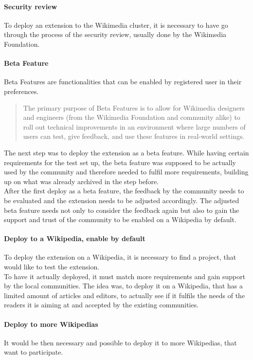   \paragraph{Security review}
  To deploy an extension to the Wikimedia cluster, it is necessary to have go through the process of the security review, usually done by the Wikimedia Foundation.

  \paragraph{Beta Feature}
  Beta Features are functionalities that can be enabled by registered user in their preferences. 
  \begin{quotation}
	  The primary purpose of Beta Features is to allow for Wikimedia designers and engineers (from the Wikimedia Foundation and community alike) to roll out technical improvements in an environment where large numbers of users can test, give feedback, and use these features in real-world settings.
  \end{quotation}   
  
  The next step was to deploy the extension as a beta feature. While having certain requirements for the test set up, the beta feature was supposed to be actually used by the community and therefore needed to fulfil more requirements, building up on what was already archived in the step before. \\
  After the first deploy as a beta feature, the feedback by the community needs to be evaluated and the extension needs to be adjusted accordingly. The adjusted beta feature needs not only to consider the feedback again but also to gain the support and trust of the community to be enabled on a Wikipedia by default.

  \paragraph{Deploy to a Wikipedia, enable by default}
  To deploy the extension on a Wikipedia, it is necessary to find a project, that would like to test the extension. \\
  To have it actually deployed, it must match more requirements and gain support by the local communities. The idea was, to deploy it on a Wikipedia, that has a limited amount of articles and editors, to actually see if it fulfils the needs of the readers it is aiming at and accepted by the existing communities. 

  \paragraph{Deploy to more Wikipedias}
  It would be then necessary and possible to deploy it to more Wikipedias, that want to participate. 

